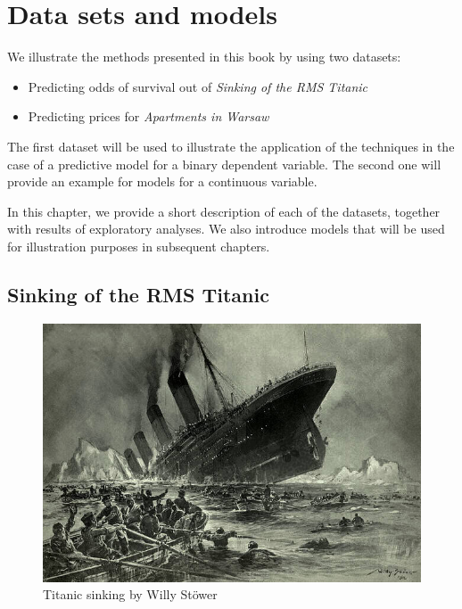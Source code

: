 \documentclass[]{krantz}
\providecommand{\tightlist}{%
  \setlength{\itemsep}{0pt}\setlength{\parskip}{0pt}}
\begin{document}
\hypertarget{dataSetsIntro}{%
\chapter{Data sets and models}\label{dataSetsIntro}}

We illustrate the methods presented in this book by using two datasets:

\begin{itemize}
\tightlist
\item
  Predicting odds of survival out of \emph{Sinking of the RMS Titanic}
\item
  Predicting prices for \emph{Apartments in Warsaw}
\end{itemize}

The first dataset will be used to illustrate the application of the techniques in the case of a predictive model for a binary dependent variable. The second one will provide an example for models for a continuous variable.

In this chapter, we provide a short description of each of the datasets, together with results of exploratory analyses. We also introduce models that will be used for illustration purposes in subsequent chapters.

\hypertarget{TitanicDataset}{%
\section{Sinking of the RMS Titanic}\label{TitanicDataset}}

\begin{figure}
\centering
\includegraphics{figure/Titanic.jpg}
\caption{Titanic sinking by Willy Stöwer}
\end{figure}
\end{document}
